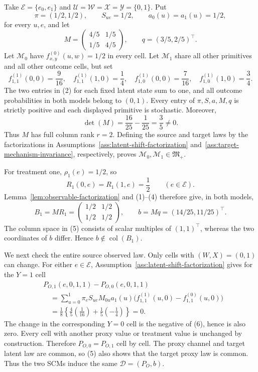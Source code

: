 Take \(\mathcal E=\{e_0,e_1\}\) and \(\mathcal U=\mathcal W=\mathcal X=\mathcal Y=\{0,1\}\). Put
\[
\pi=(1/2,1/2),\qquad
S_{ue}=1/2,\qquad
a_0(u)=a_1(u)=1/2,
\]
for every \(u,e\), and let
\[
M=\begin{pmatrix}4/5&1/5\\1/5&4/5\end{pmatrix},
\qquad
q=(3/5,2/5)^{\top}.
\tag{1}
\]
Let \(\mathcal M_0\) have \(f^{(0)}_{x,y}(u,w)=1/2\) in every cell. Let \(\mathcal M_1\) share all other primitives and all other outcome cells, but set
\[
f^{(1)}_{1,1}(0,0)=\frac9{16},\quad
f^{(1)}_{1,1}(1,0)=\frac14,\quad
f^{(1)}_{1,0}(0,0)=\frac7{16},\quad
f^{(1)}_{1,0}(1,0)=\frac34.
\tag{2}
\]
The two entries in (2) for each fixed latent state sum to one, and all outcome probabilities in both models belong to \((0,1)\). Every entry of \(\pi,S,a,M,q\) is strictly positive and each displayed primitive is stochastic. Moreover,
\[
\det(M)=\frac{16}{25}-\frac1{25}=\frac35\ne0.
\tag{3}
\]
Thus \(M\) has full column rank \(r=2\). Defining the source and target laws by the factorizations in Assumptions~\ref{ass:latent-shift-factorization} and~\ref{ass:target-mechanism-invariance}, respectively, proves \(\mathcal M_0,\mathcal M_1\in\mathfrak M_{+}\).

For treatment one, \(\rho_1(e)=1/2\), so
\[
R_1(0,e)=R_1(1,e)=\frac12
\qquad(e\in\mathcal E).
\tag{4}
\]
Lemma~\ref{lem:observable-factorization} and (1)--(4) therefore give, in both models,
\[
B_1=MR_1=
\begin{pmatrix}1/2&1/2\\1/2&1/2\end{pmatrix},
\qquad
b=Mq=(14/25,11/25)^{\top}.
\tag{5}
\]
The column space in (5) consists of scalar multiples of \((1,1)^{\top}\), whereas the two coordinates of \(b\) differ. Hence \(b\notin\operatorname{col}(B_1)\).

We next check the entire source observed law. Only cells with \((W,X)=(0,1)\) can change. For either \(e\in\mathcal E\), Assumption~\ref{ass:latent-shift-factorization} gives for the \(Y=1\) cell
\[
\begin{aligned}
&P_{O,1}(e,0,1,1)-P_{O,0}(e,0,1,1)\\
&\quad=\sum_{u=0}^1 \pi_eS_{ue}M_{0u}a_1(u)
 \bigl(f^{(1)}_{1,1}(u,0)-f^{(0)}_{1,1}(u,0)\bigr)\\
&\quad=\frac18\left\{\frac45\left(\frac1{16}\right)
 +\frac15\left(-\frac14\right)\right\}=0.
\end{aligned}
\tag{6}
\]
The change in the corresponding \(Y=0\) cell is the negative of (6), hence is also zero. Every cell with another proxy value or treatment value is unchanged by construction. Therefore \(P_{O,0}=P_{O,1}\) cell by cell. The proxy channel and target latent law are common, so (5) also shows that the target proxy law is common. Thus the two SCMs induce the same \(\mathcal D=(P_O,b)\).


